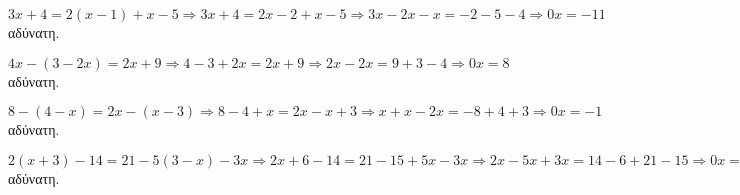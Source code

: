 \begin{alist}
\item $ 3x+4=2(x-1)+x-5\Rightarrow 3x+4=2x-2+x-5\Rightarrow 3x-2x-x=-2-5-4\Rightarrow 0x=-11 $ αδύνατη.
\item $ 4x-(3-2x)=2x+9\Rightarrow 4-3+2x=2x+9\Rightarrow 2x-2x=9+3-4\Rightarrow 0x=8 $ αδύνατη.
\item $ 8-(4-x)=2x-(x-3)\Rightarrow 8-4+x=2x-x+3\Rightarrow x+x-2x=-8+4+3\Rightarrow 0x=-1 $ αδύνατη. 
\item $ 2(x+3)-14=21-5(3-x)-3x\Rightarrow 2x+6-14=21-15+5x-3x\Rightarrow 2x-5x+3x=14-6+21-15\Rightarrow 0x=14 $ αδύνατη.
\end{alist}
